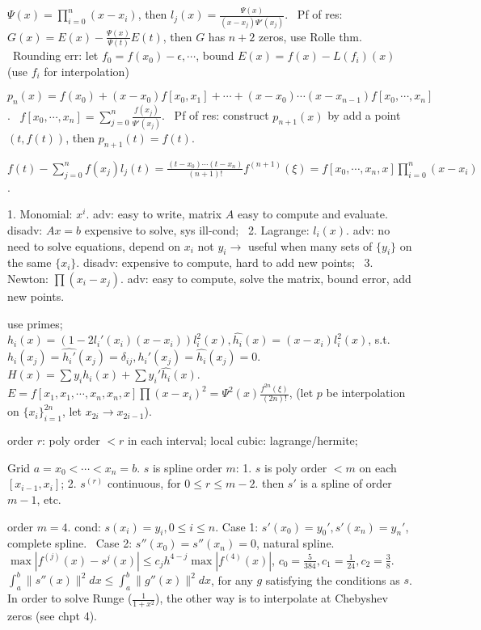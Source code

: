  $\Psi(x) = \prod_{i=0}^{n}(x-x_i)$, then $l_j(x) = \frac{\Psi(x)}{(x-x_j)\Psi'(x_j)}$. ~Pf of res: $G(x) = E(x)-\frac{\Psi(x)}{\Psi(t)}E(t)$, then $G$ has $n+2$ zeros, use Rolle thm. ~Rounding err: let $f_0 = f(x_0)-\epsilon,\cdots $, bound $E(x) = f(x) - L(f_i)(x)$ (use $f_i $ for interpolation)

 $p_n(x) = f(x_0)+(x-x_0)f[x_0,x_1]+\cdots + (x-x_0)\cdots(x-x_{n-1})f[x_0,\cdots, x_n] $. ~$f[x_0,\cdots, x_n] = \sum_{j=0}^{n}\frac{f(x_j)}{\Psi'(x_j)}$. ~Pf of res: construct $p_{n+1}(x) $ by add a point $(t, f(t))$, then $p_{n+1}(t) = f(t) $.

 $f(t)- \sum_{j=0}^{n}f(x_j)l_j(t)  = \frac{(t-x_0)\cdots(t-x_n)}{(n+1)!}f^{(n+1)}(\xi) = f[x_0, \cdots, x_n, x]\prod_{i=0}^{n}(x-x_i)$.

 1. Monomial: $x^i $. adv: easy to write, matrix $A$ easy to compute and evaluate. disadv: $Ax=b$ expensive to solve, sys ill-cond; ~2. Lagrange: $l_i(x) $. adv: no need to solve equations, depend on $x_i $ not $y_i \to$ useful when many sets of $\{y_i\}$ on the same $\{x_i\}$. disadv: expensive to compute, hard to add new points; ~3. Newton: $\prod(x_i-x_j)$. adv: easy to compute, solve the matrix, bound error, add new points.

 use primes; $h_i(x) = (1-2l_i'(x_i)(x-x_i))l_i^2(x), \hat{h_i}(x) = (x-x_i)l_i^2(x) $, s.t. $h_i(x_j)=\hat{h_i'}(x_j) = \delta_{ij}, h_i'(x_j) = \hat{h_i}(x_j) = 0 $. ~$H(x) = \sum y_ih_i(x)+\sum y_i'\hat{h_i}(x) $. ~ $E = f[x_1, x_1, \cdots, x_n, x_n, x]\prod(x-x_i)^2 = \Psi^2(x)\frac{f^{2n}(\xi)}{(2n)!}$, (let $p$ be interpolation on $\{x_i\}_{i=1}^{2n} $, let $x_{2i}\to x_{2i-1} $).

 order $r$: poly order $< r$ in each interval; local cubic: lagrange/hermite;

 Grid $a = x_0<\cdots<x_n = b $. $s$ is spline order $m$: 1. $s$ is poly order $<m$ on each $[x_{i-1}, x_i]$; 2. $s^{(r)} $ continuous, for $0\le r\le m-2$. then $s'$ is a spline of order $m-1$, etc. 

 order $m=4$. cond: $s(x_i) = y_i, 0\le i\le n $. Case 1: $s'(x_0) = y_0', s'(x_n) = y_n' $, complete spline. ~Case 2: $s''(x_0) = s''(x_n) = 0$, natural spline.  $\max|f^{(j)}(x)-s^{j}(x)|\le c_jh^{4-j}\max|f^{(4)}(x)| $, $c_0 = \frac{5}{384}, c_1 = \frac{1}{24}, c_2 = \frac{3}{8}. $ ~$\int_{a}^{b}\lVert s''(x)\rVert^2dx\le\int_{a}^{b}\lVert g''(x)\rVert^2dx $, for any $g$ satisfying the conditions as $s$. In order to solve Runge ($\frac{1}{1+x^2}$), the other way is to interpolate at Chebyshev zeros (see chpt 4).


